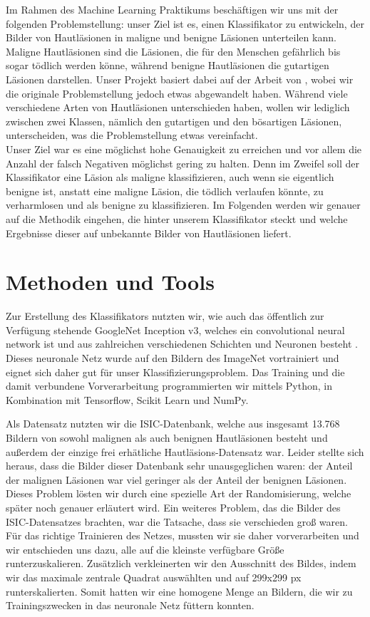 \documentclass[a4paper, doc]{apa6}
\begin{document}
Im Rahmen des Machine Learning Praktikums beschäftigen wir uns mit der folgenden Problemstellung: unser Ziel ist es, einen Klassifikator zu entwickeln, der Bilder von Hautläsionen in maligne und benigne Läsionen unterteilen kann. Maligne Hautläsionen sind die Läsionen, die für den Menschen gefährlich bis sogar tödlich werden könne, während benigne Hautläsionen die gutartigen Läsionen darstellen. Unser Projekt basiert dabei auf der Arbeit von \citet{esteva2017dermatologist}, wobei wir die originale Problemstellung jedoch etwas abgewandelt haben. Während \citet{esteva2017dermatologist} viele verschiedene Arten von Hautläsionen unterschieden haben, wollen wir lediglich zwischen zwei Klassen, nämlich den gutartigen und den bösartigen Läsionen, unterscheiden, was die Problemstellung etwas vereinfacht.\\
Unser Ziel war es eine möglichst hohe Genauigkeit zu erreichen und vor allem die Anzahl der falsch Negativen möglichst gering zu halten. Denn im Zweifel soll der Klassifikator eine Läsion als maligne klassifizieren, auch wenn sie eigentlich benigne ist, anstatt eine maligne Läsion, die tödlich verlaufen könnte, zu verharmlosen und als benigne zu klassifizieren. Im Folgenden werden wir genauer auf die Methodik eingehen, die hinter unserem Klassifikator steckt und welche Ergebnisse dieser auf unbekannte Bilder von Hautläsionen liefert. 

\section{Methoden und Tools}

Zur Erstellung des Klassifikators nutzten wir, wie \citet{esteva2017dermatologist} auch das öffentlich zur Verfügung stehende GoogleNet Inception v3, welches ein convolutional neural network ist und aus zahlreichen verschiedenen Schichten und Neuronen besteht \citep{szegedy2016rethinking} . Dieses neuronale Netz wurde auf den Bildern des ImageNet vortrainiert \citep{russakovsky2015imagenet} und eignet sich daher gut für unser Klassifizierungsproblem. Das Training und die damit verbundene Vorverarbeitung programmierten wir mittels Python, in Kombination mit Tensorflow, Scikit Learn und NumPy. 

Als Datensatz nutzten wir die ISIC-Datenbank, welche aus insgesamt 13.768 Bildern von sowohl malignen als auch benignen Hautläsionen besteht und außerdem der einzige frei erhätliche Hautläsions-Datensatz war. Leider stellte sich heraus, dass die Bilder dieser Datenbank sehr unausgeglichen waren: der Anteil der malignen Läsionen war viel geringer als der Anteil der benignen Läsionen. Dieses Problem lösten wir durch eine spezielle Art der Randomisierung, welche später noch genauer erläutert wird. Ein weiteres Problem, das die Bilder des ISIC-Datensatzes brachten, war die Tatsache, dass sie verschieden groß waren. Für das richtige Trainieren des Netzes, mussten wir sie daher vorverarbeiten und wir entschieden uns dazu, alle auf die kleinste verfügbare Größe runterzuskalieren. Zusätzlich verkleinerten wir den Ausschnitt des Bildes, indem wir das maximale zentrale Quadrat auswählten und auf 299x299 px runterskalierten. Somit hatten wir eine homogene Menge an Bildern, die wir zu Trainingszwecken in das neuronale Netz füttern konnten. 
\end{document}

